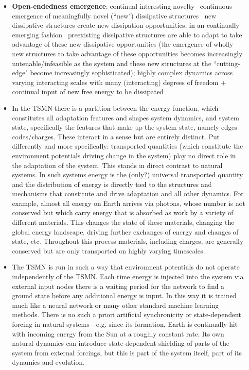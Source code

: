 \documentclass[12pt,letterpaper]{article}
\begin{document}
\begin{itemize}
\item \textbf{Open-endedness emergence}: continual interesting novelty \textleftarrow\, continuous emergence of meaningfully novel (``new") dissipative structures \textleftarrow\, new dissipative structures create new dissipation opportunities, in an continually emerging fashion \textleftarrow\, preexisting dissipative structures are able to adapt to take advantage of these new dissipative opportunities (the emergence of wholly new structures to take advantage of these opportunities becomes increasingly untenable/infeasible as the system and these new structures at the ``cutting-edge" become increasingly sophisticated); highly complex dynamics across varying interacting scales with many (interacting) degrees of freedom + continual input of new free energy to be dissipated
\item In the TSMN there is a partition between the energy function, which constitutes all adaptation features and shapes system dynamics, and system state, specifically the features that make up the system state, namely edges codes/charges. These interact in a sense but are entirely distinct. Put differently and more specifically: transported quantities (which constitute the environment potentials driving change in the system) play no direct role in the adaptation of the system. This stands in direct contrast to natural systems. In such systems energy is the (only?) universal transported quantity and the distribution of energy is directly tied to the structures and mechanisms that constitute and drive adaptation and all other dynamics. For example, almost all energy on Earth arrives via photons, whose number is not conserved but which carry energy that is absorbed as work by a variety of different materials. This changes the state of these materials, changing the global energy landscape, driving further exchanges of energy and changes of state, etc. Throughout this process materials, including charges, are generally conserved but are only transported on highly varying timescales.
\item The TSMN is run in such a way that environment potentials do not operate independently of the TSMN. Each time energy is injected into the system via external input nodes there is a waiting period for the network to find a ground state before any additional energy is input. In this way it is trained much like a neural network or many other standard machine learning methods. There is no such a priori artificial synchronicity or state-dependent forcing in natural systems---e.g. since its formation, Earth is continually hit with incoming energy from the Sun at a roughly constant rate. Its own natural dynamics can introduce state-dependent shielding of parts of the system from external forcings, but this is part of the system itself, part of its dynamics and evolution.

\end{itemize}
\end{document}
